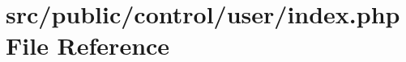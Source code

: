\hypertarget{control_2user_2index_8php}{}\section{src/public/control/user/index.php File Reference}
\label{control_2user_2index_8php}
